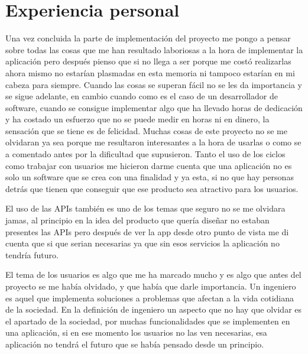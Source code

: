 \section{Experiencia personal}
\label{secc:Experiencia personal}

Una vez concluida la parte de implementación del proyecto me pongo a pensar sobre todas las cosas que me han resultado laboriosas a la hora de implementar la aplicación pero después pienso que si no llega a ser porque me costó realizarlas ahora mismo no estarían plasmadas en esta memoria ni tampoco estarían en mi cabeza para siempre. Cuando las cosas se superan fácil no se les da importancia y se sigue adelante, en cambio cuando como es el caso de un desarrollador de software, cuando se consigue implementar algo que ha llevado horas de dedicación y ha costado un esfuerzo que no se puede medir en horas ni en dinero, la sensación que se tiene es de felicidad. Muchas cosas de este proyecto no se me olvidaran ya sea porque me resultaron interesantes a la hora de usarlas o como se a comentado antes por la dificultad que supusieron. Tanto el uso de los ciclos como trabajar con usuarios me hicieron darme cuenta que una aplicación no es solo un software que se crea con una finalidad y ya esta, si no que hay personas detrás que tienen que conseguir que ese producto sea atractivo para los usuarios. 

El uso de las APIs también es uno de los temas que seguro no se me olvidara jamas, al principio en la idea del producto que quería diseñar no estaban presentes las APIs pero después de ver la app desde otro punto de vista me di cuenta que si que serian necesarias ya que sin esos servicios la aplicación no tendría futuro.

El tema de los usuarios es algo que me ha marcado mucho y es algo que antes del proyecto se me había olvidado, y que había que darle importancia. Un ingeniero es aquel que implementa soluciones a problemas que afectan a la vida cotidiana de la sociedad. En la definición de ingeniero un aspecto que no hay que olvidar es el apartado de la sociedad, por muchas funcionalidades que se implementen en una aplicación, si en ese momento los usuarios no las ven necesarias, esa aplicación no tendrá el futuro que se había pensado desde un principio.

